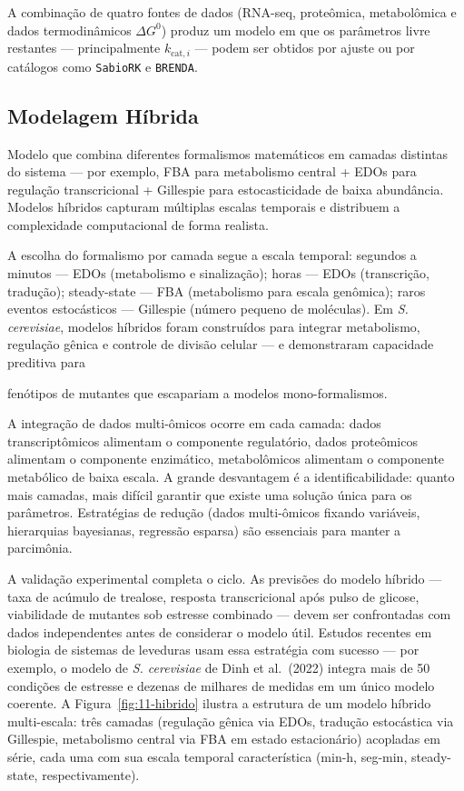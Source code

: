 A combinação de quatro fontes de dados (RNA-seq, proteômica, metabolômica
e dados termodinâmicos $\Delta G^0$) produz um modelo em que os parâmetros
livre restantes --- principalmente $k_{\mathrm{cat},i}$ --- podem ser
obtidos por ajuste ou por catálogos como \texttt{SabioRK} e \texttt{BRENDA}.

\subsection{Modelagem Híbrida}
\label{sub:image11-hibridos}

\begin{definicaoenv}
Modelo que combina diferentes formalismos matemáticos em camadas distintas
do sistema --- por exemplo, FBA para metabolismo central + EDOs para
regulação transcricional + Gillespie para estocasticidade de baixa
abundância. Modelos híbridos capturam múltiplas escalas temporais e
distribuem a complexidade computacional de forma realista.
\end{definicaoenv}

A escolha do formalismo por camada segue a escala temporal: segundos a
minutos --- EDOs (metabolismo e sinalização); horas --- EDOs
(transcrição, tradução); steady-state --- FBA (metabolismo para escala
genômica); raros eventos estocásticos --- Gillespie (número pequeno de
moléculas). Em \textit{S. cerevisiae}, modelos híbridos foram construídos
para integrar metabolismo, regulação gênica e controle de divisão celular
--- e demonstraram capacidade preditiva para

fenótipos de mutantes que escapariam a modelos mono-formalismos.

A integração de dados multi-ômicos ocorre em cada camada:
dados transcriptômicos alimentam o componente regulatório, dados
proteômicos alimentam o componente enzimático, metabolômicos alimentam o
componente metabólico de baixa escala. A grande desvantagem é a
identificabilidade: quanto mais camadas, mais difícil garantir que existe
uma solução única para os parâmetros. Estratégias de redução (dados
multi-ômicos fixando variáveis, hierarquias bayesianas, regressão
esparsa) são essenciais para manter a parcimônia.

A validação experimental completa o ciclo. As previsões do modelo híbrido
--- taxa de acúmulo de trealose, resposta transcricional após pulso de
glicose, viabilidade de mutantes sob estresse combinado --- devem ser
confrontadas com dados independentes antes de considerar o modelo útil.
Estudos recentes em biologia de sistemas de leveduras usam essa estratégia
com sucesso --- por exemplo, o modelo de \textit{S. cerevisiae} de
Dinh et al.\ (2022) integra mais de 50 condições de estresse e dezenas de
milhares de medidas em um único modelo coerente. A
Figura~\ref{fig:11-hibrido} ilustra a estrutura de um modelo híbrido
multi-escala: três camadas (regulação gênica via EDOs, tradução
estocástica via Gillespie, metabolismo central via FBA em estado
estacionário) acopladas em série, cada uma com sua escala temporal
característica (min-h, seg-min, steady-state, respectivamente).

